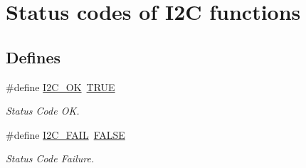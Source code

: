 \hypertarget{group___i2_c___s_t_a_t_u_s___c_o_d_e_s}{\section{\-Status codes of \-I2\-C functions}
\label{group___i2_c___s_t_a_t_u_s___c_o_d_e_s}
}
\subsection*{\-Defines}
\begin{DoxyCompactItemize}
\item 
\hypertarget{group___i2_c___s_t_a_t_u_s___c_o_d_e_s_ga57d0c95ccd7c129288743e9674a9e96d}{\#define \hyperlink{group___i2_c___s_t_a_t_u_s___c_o_d_e_s_ga57d0c95ccd7c129288743e9674a9e96d}{\-I2\-C\-\_\-\-O\-K}~\hyperlink{group___a_t_m_e_g_a___c_o_n_s_t_a_n_t_s_gaa8cecfc5c5c054d2875c03e77b7be15d}{\-T\-R\-U\-E}}\label{group___i2_c___s_t_a_t_u_s___c_o_d_e_s_ga57d0c95ccd7c129288743e9674a9e96d}

\begin{DoxyCompactList}\small\item\em \-Status \-Code \-O\-K. \end{DoxyCompactList}\item 
\hypertarget{group___i2_c___s_t_a_t_u_s___c_o_d_e_s_ga54139eea2c8f2fec652dc4b861325974}{\#define \hyperlink{group___i2_c___s_t_a_t_u_s___c_o_d_e_s_ga54139eea2c8f2fec652dc4b861325974}{\-I2\-C\-\_\-\-F\-A\-I\-L}~\hyperlink{group___a_t_m_e_g_a___c_o_n_s_t_a_n_t_s_gaa93f0eb578d23995850d61f7d61c55c1}{\-F\-A\-L\-S\-E}}\label{group___i2_c___s_t_a_t_u_s___c_o_d_e_s_ga54139eea2c8f2fec652dc4b861325974}

\begin{DoxyCompactList}\small\item\em \-Status \-Code \-Failure. \end{DoxyCompactList}\end{DoxyCompactItemize}
